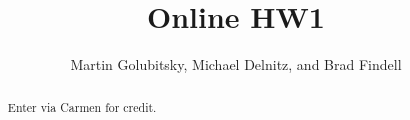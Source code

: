 \documentclass[numbers,nooutcomes,twoside,hints]{xourse}
\title{Online HW1}
\author{Martin Golubitsky, Michael Delnitz, and Brad Findell}
\begin{document}
\begin{abstract}
Enter via Carmen for credit. 
\end{abstract}
\maketitle


\end{document}
